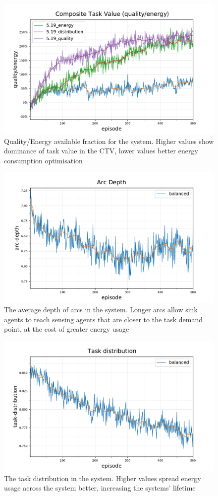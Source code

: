 \begin{figure}[ht]
	\centering
	\includegraphics[width=0.8\linewidth]{5.19_ctv-quality-energy}
	\captionsetup{labelfont=bf,singlelinecheck=on}
	\caption{Quality/Energy available fraction for the \simulationExtended{}{} system. Higher values show dominance of task value in the CTV, lower values better energy consumption optimisation}
	\label{fig:5.19_ctv-quality-energy}
\end{figure}

\begin{figure}[ht]
	\centering
	\includegraphics[width=0.7\linewidth]{5_ctv-arc-depth}
	\captionsetup{labelfont=bf,singlelinecheck=on}
	\caption{The average depth of arcs in the \simulationSimple{}{} system. Longer arcs allow sink agents to reach sensing agents that are closer to the task demand point, at the cost of greater energy usage}
	\label{fig:5_ctv-arc-depth}
\end{figure}
\begin{figure}[ht]
	\centering
	\includegraphics[width=0.7\linewidth]{5_ctv-task-distribution}
	\captionsetup{labelfont=bf,singlelinecheck=on}
	\caption{The task distribution in the system. Higher values spread energy usage across the system better, increasing the systems' lifetime}
	\label{fig:5_ctv-task-distribution}
\end{figure}
